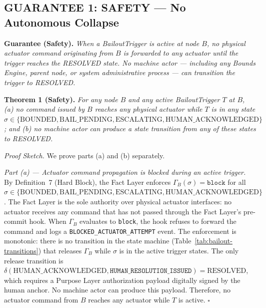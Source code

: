 \bigskip

\subsection{GUARANTEE 1: SAFETY — No Autonomous Collapse}
\bigskip

\begin{minipage}{\textwidth}
\textbf{Guarantee (Safety).} \textit{When a BailoutTrigger is active at node $B$, no physical actuator command originating from $B$ is forwarded to any actuator until the trigger reaches the RESOLVED state. No machine actor — including any Bounds Engine, parent node, or system administrative process — can transition the trigger to RESOLVED.}
\end{minipage}

\bigskip

\noindent\textbf{Theorem 1 (Safety).}
\textit{For any node $B$ and any active BailoutTrigger $T$ at $B$, (a) no command issued by $B$ reaches any physical actuator while $T$ is in any state $\sigma \in \{\text{BOUNDED}, \text{BAIL\_PENDING}, \text{ESCALATING}, \text{HUMAN\_ACKNOWLEDGED}\}$; and (b) no machine actor can produce a state transition from any of these states to RESOLVED.}

\bigskip

\noindent\textit{Proof Sketch.} We prove parts (a) and (b) separately.

\bigskip

\noindent\textit{Part (a) — Actuator command propagation is blocked during an active trigger.}
By Definition~7 (Hard Block), the Fact Layer enforces $\Gamma_B(\sigma) = \texttt{block}$ for all $\sigma \in \{\text{BOUNDED}, \text{BAIL\_PENDING}, \text{ESCALATING}, \text{HUMAN\_ACKNOWLEDGED}\}$. The Fact Layer is the sole authority over physical actuator interfaces: no actuator receives any command that has not passed through the Fact Layer's pre-commit hook. When $\Gamma_B$ evaluates to \texttt{block}, the hook refuses to forward the command and logs a \texttt{BLOCKED\_ACTUATOR\_ATTEMPT} event. The enforcement is monotonic: there is no transition in the state machine (Table~\ref{tab:bailout-transitions}) that releases $\Gamma_B$ while $\sigma$ is in the active trigger states. The only release transition is $\delta(\text{HUMAN\_ACKNOWLEDGED}, \texttt{HUMAN\_RESOLUTION\_ISSUED}) = \text{RESOLVED}$, which requires a Purpose Layer authorization payload digitally signed by the human anchor. No machine actor can produce this payload. Therefore, no actuator command from $B$ reaches any actuator while $T$ is active. $\square$

